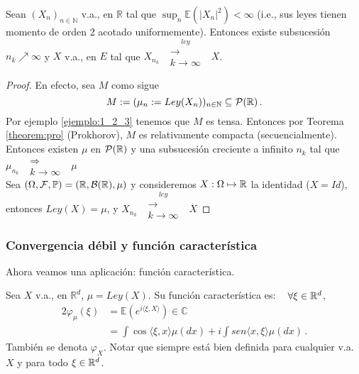 \begin{example}
Sean $(X_n)_{n\in\mathbb{N}}$ v.a., en $\mathbb{R}$ tal que $\displaystyle\sup_n\mathbb{E}(|X_n|^2)<\infty$ (i.e., sus leyes tienen momento de orden 2 acotado uniformemente). Entonces existe subsucesión $n_k\nearrow\infty$ y $X$ v.a., en $E$ tal que $X_{n_k}\mbox{ }\overset{ley}{\substack{\longrightarrow \\k \to \infty}}\mbox{ }X$.
\end{example}
\begin{proof}
\gris En efecto, sea $M$ como sigue
$$ M:=(\mu_n:=Ley(X_n))_{n\in\mathbb{N}}\subseteq\mathcal{P}(\mathbb{R}) \, .$$
Por ejemplo \ref{ejemplo:1_2_3} tenemos que $M$ es tensa. Entonces por Teorema \ref{theorem:pro} (Prokhorov), $M$ es relativamente compacta (secuencialmente). Entonces existen $\mu$ en $\mathcal{P}(\mathbb{R})$ y una subsucesión creciente a infinito $n_k$ tal que $\mu_{n_k}\mbox{ }\substack{\Longrightarrow \\k \to \infty}\mbox{ } \mu$ 
\\ Sea $(\Omega,\mathcal{F},\mathbb{P}) = (\mathbb{R},\mathcal{B}(\mathbb{R}),\mu)$ y consideremos $X:\Omega\mapsto\mathbb{R}$ la identidad ($X=Id$), \\ entonces $Ley(X)=\mu$, y $X_{n_k}\mbox{ }\overset{ley}{\substack{\longrightarrow \\k \to \infty}}\mbox{ } X$
\findem
\negro
\end{proof}

\subsubsection{Convergencia débil y función característica}
Ahora veamos una aplicación: función característica.

\begin{definition}
Sea $X$ v.a., en $\mathbb{R}^d$, $\mu=Ley(X)$. Su función característica es: $ \hspace{.25cm}\, \forall \xi\in\mathbb{R}^d$,
\begin{alignat*}{2}
    \varphi_\mu(\xi) & = \mathbb{E}(e^{i\langle\xi,X\rangle}) \in\mathbb{C} \\
     & =\int \cos\langle\xi,x\rangle\mu(dx) +i\int sen\langle x,\xi\rangle\mu(dx) \, .
\end{alignat*}
También se denota $\varphi_X$. Notar que siempre está bien definida para cualquier v.a. $X$ y para todo $\xi\in\mathbb{R}^d$.
\end{definition} 

